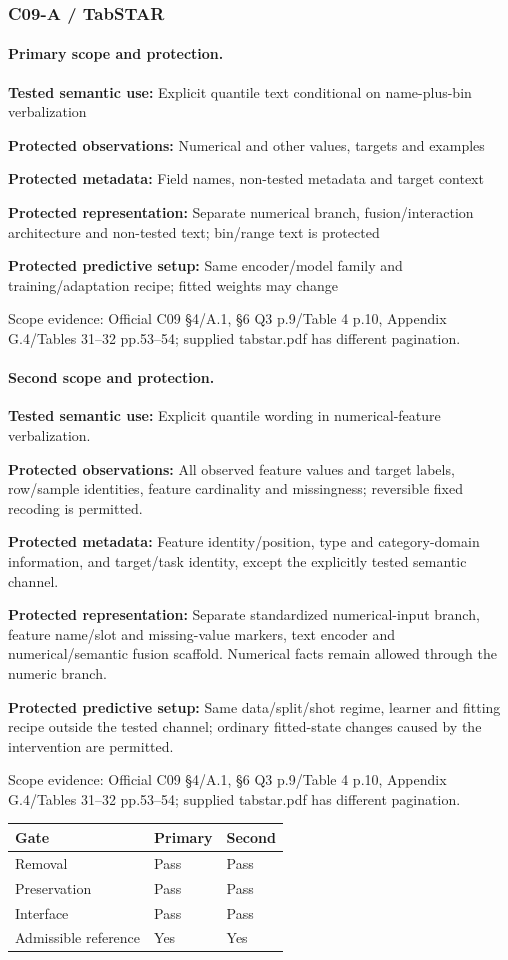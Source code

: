 \documentclass[10pt]{article}
\begin{document}
\subsubsection*{C09-A / TabSTAR}
\paragraph{Primary scope and protection.}
\textbf{Tested semantic use:} Explicit quantile text conditional on name-plus-bin verbalization\par
\textbf{Protected observations:} Numerical and other values, targets and examples\par
\textbf{Protected metadata:} Field names, non-tested metadata and target context\par
\textbf{Protected representation:} Separate numerical branch, fusion/interaction architecture and non-tested text; bin/range text is protected\par
\textbf{Protected predictive setup:} Same encoder/model family and training/adaptation recipe; fitted weights may change\par
Scope evidence: Official C09 §4/A.1, §6 Q3 p.9/Table 4 p.10, Appendix G.4/Tables 31--32 pp.53--54; supplied tabstar.pdf has different pagination.\par
\paragraph{Second scope and protection.}
\textbf{Tested semantic use:} Explicit quantile wording in numerical-feature verbalization.\par
\textbf{Protected observations:} All observed feature values and target labels, row/sample identities, feature cardinality and missingness; reversible fixed recoding is permitted.\par
\textbf{Protected metadata:} Feature identity/position, type and category-domain information, and target/task identity, except the explicitly tested semantic channel.\par
\textbf{Protected representation:} Separate standardized numerical-input branch, feature name/slot and missing-value markers, text encoder and numerical/semantic fusion scaffold. Numerical facts remain allowed through the numeric branch.\par
\textbf{Protected predictive setup:} Same data/split/shot regime, learner and fitting recipe outside the tested channel; ordinary fitted-state changes caused by the intervention are permitted.\par
Scope evidence: Official C09 §4/A.1, §6 Q3 p.9/Table 4 p.10, Appendix G.4/Tables 31--32 pp.53--54; supplied tabstar.pdf has different pagination.\par
\begin{tabular}{lll}\toprule Gate & Primary & Second \\ \midrule
Removal & Pass & Pass \\
Preservation & Pass & Pass \\
Interface & Pass & Pass \\
Admissible reference & Yes & Yes \\
\bottomrule\end{tabular}
\end{document}
